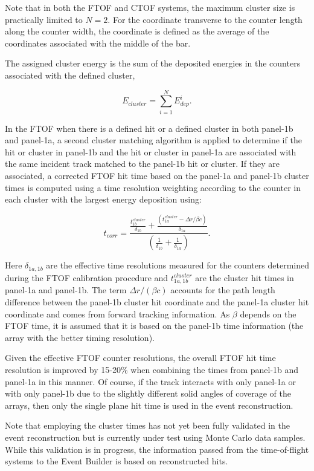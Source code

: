 \noindent
Note that in both the FTOF and CTOF systems, the maximum cluster size is practically limited to $N=2$. For the
coordinate transverse to the counter length along the counter width, the coordinate is defined as the average of
the coordinates associated with the middle of the bar.

The assigned cluster energy is the sum of the deposited energies in the counters associated with the defined
cluster,

\begin{equation}
  E_{cluster} = \sum_{i=1}^N E_{dep}^i.
\end{equation}

In the FTOF when there is a defined hit or a defined cluster in both panel-1b and panel-1a, a second cluster matching
algorithm is applied to determine if the hit or cluster in panel-1b and the hit or cluster in panel-1a are associated with
the same incident track matched to the panel-1b hit or cluster. If they are associated, a corrected FTOF hit time based
on the panel-1a and panel-1b cluster times is computed using a time resolution weighting according to the counter in
each cluster with the largest energy deposition using:

\begin{equation}
  t_{corr} = \frac{\displaystyle \frac{\displaystyle t_{1b}^{cluster}}{\displaystyle \delta_{1b}} +
    \frac{\displaystyle (t_{1a}^{cluster} - \Delta r/\beta c)}{\displaystyle \delta_{1a}}}
  {\displaystyle \left( \frac{\displaystyle 1}{\displaystyle \delta_{1b}} +
    \frac{\displaystyle 1}{\displaystyle \delta_{1a}} \right)}.
\end{equation}

\noindent
Here $\delta_{1a,1b}$ are the effective time resolutions measured for the counters determined during the
FTOF calibration procedure and $t_{1a,1b}^{cluster}$ are the cluster hit times in panel-1a and panel-1b. The term
$\Delta r/(\beta c)$ accounts for the path length difference between the panel-1b cluster hit coordinate and
the panel-1a cluster hit coordinate and comes from forward tracking information. As $\beta$ depends on the
FTOF time, it is assumed that it is based on the panel-1b time information (the array with the better timing
resolution).

Given the effective FTOF counter resolutions, the overall FTOF hit time resolution is improved by 15-20\%
when combining the times from panel-1b and panel-1a in this manner. Of course, if the track interacts with only
panel-1a or with only panel-1b due to the slightly different solid angles of coverage of the arrays, then only the
single plane hit time is used in the event reconstruction. 

Note that employing the cluster times has not yet been fully validated in the event reconstruction but is currently
under test using Monte Carlo data samples. While this validation is in progress, the information passed from the
time-of-flight systems to the Event Builder is based on reconstructed hits.
